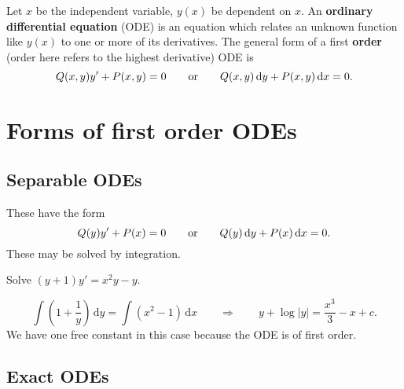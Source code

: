 \documentclass[letter-paper]{tufte-book}
\newenvironment{example}[1][Example]{\begin{trivlist}
\item[\hskip \labelsep {\bfseries #1}]}{\end{trivlist}}
\newcommand\Def[1]{\textbf{#1}}
\begin{document}
Let $x$ be the independent variable, $y(x)$ be dependent on $x$. An
\Def{ordinary differential equation} (ODE) is an equation which relates an
unknown function like $y(x)$ to one or more of its derivatives. The general form
of a first \Def{order} (order here refers to the highest derivative) ODE
is
\begin{equation*}
  Q(x,y)y'+P(x,y)=0\qquad\textnormal{or}\qquad
  Q(x,y)\,\mathrm{d}y + P(x,y)\,\mathrm{d}x=0.
\end{equation*}


\section{Forms of first order ODEs}

\subsection{Separable ODEs}

These have the form
\begin{equation*}
  Q(y)y'+P(x)=0\qquad\textnormal{or}\qquad
  Q(y)\,\mathrm{d}y + P(x)\,\mathrm{d}x=0.
\end{equation*}
These may be solved by integration.
\begin{example}
  Solve $(y+1)y'=x^2 y - y$.
  
  \begin{equation*}
    \int \left(1+\frac{1}{y}\right)\, \mathrm{d}y=\int (x^2-1)\, \mathrm{d}x
    \qquad\Rightarrow\qquad
    y+\log|y|=\frac{x^3}{3}-x+c.
  \end{equation*}
  We have one free constant in this case because the ODE is of first order.
\end{example}

\subsection{Exact ODEs}
\end{document}
